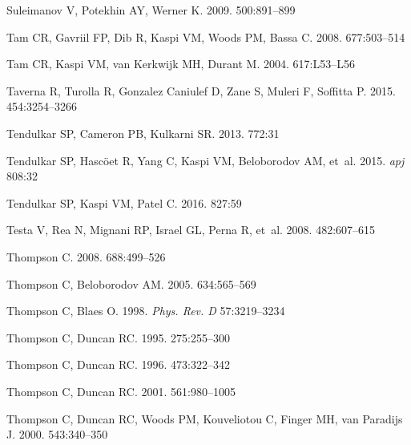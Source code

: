\documentclass[letterpaper]{ar-1col}
\begin{document}
\begin{thebibliography}{}
{Suleimanov} V, {Potekhin} AY, {Werner} K. 2009.
\textit{\aap} 500:891--899

{Tam} CR, {Gavriil} FP, {Dib} R, {Kaspi} VM, {Woods} PM, {Bassa} C. 2008.
\textit{\apj} 677:503--514

Tam CR, Kaspi VM, van Kerkwijk MH, Durant M. 2004.
\textit{\apj} 617:L53--L56

{Taverna} R, {Turolla} R, {Gonzalez Caniulef} D, {Zane} S, {Muleri} F,
  {Soffitta} P. 2015.
\textit{\mnras} 454:3254--3266

{Tendulkar} SP, {Cameron} PB, {Kulkarni} SR. 2013.
\textit{\apj} 772:31

{Tendulkar} SP, {Hasc{\"o}et} R, {Yang} C, {Kaspi} VM, {Beloborodov} AM, et~al.
  2015.
\textit{apj} 808:32

{Tendulkar} SP, {Kaspi} VM, {Patel} C. 2016.
\textit{\apj} 827:59

{Testa} V, {Rea} N, {Mignani} RP, {Israel} GL, {Perna} R, et~al. 2008.
\textit{\aap} 482:607--615

{Thompson} C. 2008.
\textit{\apj} 688:499--526

{Thompson} C, {Beloborodov} AM. 2005.
\textit{\apj} 634:565--569

Thompson C, Blaes O. 1998.
\textit{Phys. Rev. D} 57:3219--3234

{Thompson} C, {Duncan} RC. 1995.
\textit{\mnras} 275:255--300

Thompson C, Duncan RC. 1996.
\textit{\apj} 473:322--342

Thompson C, Duncan RC. 2001.
\textit{\apj} 561:980--1005

{Thompson} C, {Duncan} RC, {Woods} PM, {Kouveliotou} C, {Finger} MH, {van
  Paradijs} J. 2000.
\textit{\apj} 543:340--350


\end{thebibliography}
\end{document}
